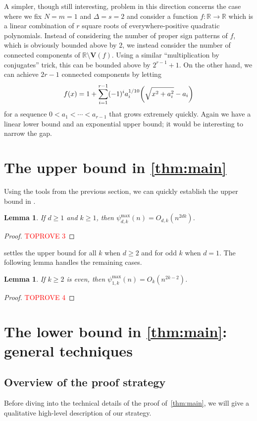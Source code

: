 \documentclass[11pt]{amsart}
\newtheorem{lemma}[theorem]{Lemma}
\theoremstyle{definition}
\DeclarePairedDelimiter{\paren}{(}{)}
\newcommand{\perm}{\psi^{\mathrm{max}}}
\newcommand{\RR}{\mathbb{R}}
\newcommand{\VV}{\mathbf{V}}
\begin{document}
A simpler, though still interesting, problem in this direction concerns the case where we fix $N = m = 1$ and $\Delta = s = 2$ and consider a function $f \colon \RR \to \RR$ which is a linear combination of $r$ square roots of everywhere-positive quadratic polynomials. Instead of considering the number of proper sign patterns of $f$, which is obviously bounded above by $2$, we instead consider the number of connected components of $\RR \setminus \VV(f)$. Using a similar ``multiplication by conjugates'' trick, this can be bounded above by $2^{r-1} + 1$. On the other hand, we can achieve $2r-1$ connected components by letting
\[f(x) = 1 + \sum_{i=1}^{r-1} (-1)^i a_i^{1/10} \paren*{\sqrt{x^2 + a_i^2} - a_i}\]
for a sequence $0 < a_1 < \cdots < a_{r-1}$ that grows extremely quickly. Again we have a linear lower bound and an exponential upper bound; it would be interesting to narrow the gap.

\section{The upper bound in \texorpdfstring{\cref{thm:main}}{Theorem \ref{thm:main}}}\label{sec:upper}

Using the tools from the previous section, we can quickly establish the upper bound in .

\begin{lemma}\label{lem:main-upper}
If $d \geq 1$ and $k \geq 1$, then $\perm_{d,k}(n)=O_{d,k}(n^{2dk})$.
\end{lemma}

\begin{proof}\textcolor{red}{TOPROVE 3}\end{proof}

 settles the upper bound for all $k$ when $d \geq 2$ and for odd $k$ when $d = 1$.  The following lemma handles the remaining cases.
\begin{lemma}
If $k \geq 2$ is even, then $\perm_{1,k}(n)=O_{k}(n^{2k-2})$.
\end{lemma}
\begin{proof}\textcolor{red}{TOPROVE 4}\end{proof}

\section{The lower bound in \texorpdfstring{\cref{thm:main}}{Theorem \ref{thm:main}}: general techniques}\label{sec:lower}
\subsection{Overview of the proof strategy} \label{subsec:lowerintro}
Before diving into the technical details of the proof of~\cref{thm:main}, we will give a qualitative high-level description of our strategy.
\end{document}
